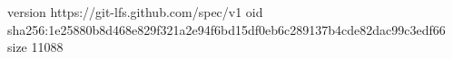 version https://git-lfs.github.com/spec/v1
oid sha256:1e25880b8d468e829f321a2e94f6bd15df0eb6c289137b4cde82dac99c3edf66
size 11088
